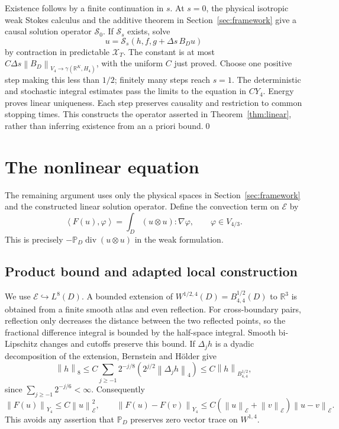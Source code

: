 \documentclass[11pt]{article}
\numberwithin{equation}{section}
\theoremstyle{remark}
\newcommand{\R}{\mathbb R}
\newcommand{\PP}{\mathbb P}
\newcommand{\divg}{\operatorname{div}}
\newcommand{\calE}{\mathcal E}
\newcommand{\calX}{\mathcal X}
\newcommand{\norm}[1]{\left\lVert#1\right\rVert}
\newcommand{\ip}[2]{\left\langle#1,#2\right\rangle}
\begin{document}
Existence follows by a finite continuation in $s$. At $s=0$, the
physical isotropic weak Stokes calculus and the additive theorem in
Section~\ref{sec:framework} give a causal solution operator $\mathcal S_0$.
If $\mathcal S_s$ exists, solve
\[
 u=\mathcal S_s(h,f,g+\Delta s\,B_Du)
\]
by contraction in predictable $\calX_T$. The constant is at most
$C\Delta s\norm{B_D}_{V_4\to\gamma(\R^K,H_4)}$, with the uniform
$C$ just proved. Choose one positive step making this less than
$1/2$; finitely many steps reach $s=1$. The deterministic and
stochastic integral estimates pass the limits to the equation in
$CY_4$. Energy proves linear uniqueness. Each step preserves
causality and restriction to common stopping times. This constructs
the operator asserted in Theorem~\ref{thm:linear}, rather than
inferring existence from an a priori bound.\qed

\section{The nonlinear equation}\label{sec:nonlinear}

The remaining argument uses only the physical spaces in
Section~\ref{sec:framework} and the constructed linear solution
operator. Define the convection term on $\calE$ by
\begin{equation}\label{eq:nonlinearity}
 \ip{F(u)}{\varphi}=\int_D(u\otimes u):\nabla\varphi,
 \qquad \varphi\in V_{4/3}.
\end{equation}
This is precisely $-\PP_D\divg(u\otimes u)$ in the weak formulation.

\subsection{Product bound and adapted local construction}\label{sec:cutoff}

We use $\calE\hookrightarrow L^8(D)$. A bounded extension of
$W^{1/2,4}(D)=B^{1/2}_{4,4}(D)$ to $\R^3$ is obtained from a
finite smooth atlas and even reflection. For cross-boundary pairs,
reflection only decreases the distance between the two reflected
points, so the fractional difference integral is bounded by the
half-space integral. Smooth bi-Lipschitz changes and cutoffs preserve
this bound. If $\Delta_jh$ is a dyadic decomposition of the extension,
Bernstein and H\"older give
\[
 \norm{h}_8\leq C\sum_{j\geq-1}2^{-j/8}
 (2^{j/2}\norm{\Delta_jh}_4)
 \leq C\norm{h}_{B^{1/2}_{4,4}},
\]
since $\sum_{j\geq-1}2^{-j/6}<\infty$. Consequently
\begin{equation}\label{eq:product}
 \norm{F(u)}_{Y_4}\leq C\norm{u}_{\calE}^2,\qquad
 \norm{F(u)-F(v)}_{Y_4}
 \leq C(\norm{u}_{\calE}+\norm{v}_{\calE})\norm{u-v}_{\calE}.
\end{equation}
This avoids any assertion that $\PP_D$ preserves zero vector trace
on $W^{1,4}$.
\end{document}
